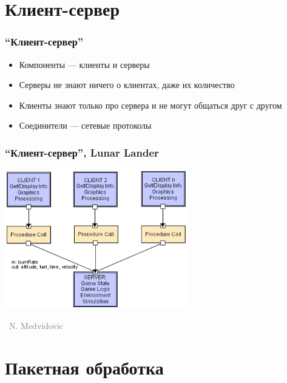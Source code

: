\documentclass[xetex,mathserif,serif]{beamer}
\newcommand{\attribution}[1] {
    \vspace{-5mm}\begin{flushright}\begin{scriptsize}\textcolor{gray}{\textcopyright\, #1}\end{scriptsize}\end{flushright}
}
\begin{document}
    \section{Клиент-сервер}

    \begin{frame}
        \frametitle{``Клиент-сервер''}
        \begin{itemize}
            \item Компоненты --- клиенты и серверы
            \item Серверы не знают ничего о клиентах, даже их количество
            \item Клиенты знают только про сервера и не могут общаться друг с другом
            \item Соединители --- сетевые протоколы
        \end{itemize}
    \end{frame}

    \begin{frame}
        \frametitle{``Клиент-сервер'', Lunar Lander}
        \begin{center}
            \includegraphics[width=0.6\textwidth]{clientServerLL.png}
            \attribution{N. Medvidovic}
        \end{center}
    \end{frame}

    \section{Пакетная обработка}
\end{document}

